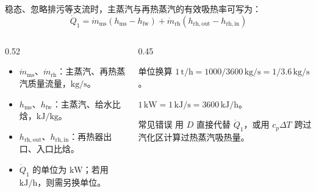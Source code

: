 \begin{frame}[t,shrink]{}
稳态、忽略排污等支流时，主蒸汽与再热蒸汽的有效吸热率可写为：
$$
\dot Q_1
=\dot m_{\mathrm{ms}}\left(h_{\mathrm{ms}}-h_{\mathrm{fw}}\right)
+\dot m_{\mathrm{rh}}\left(h_{\mathrm{rh,out}}-h_{\mathrm{rh,in}}\right)
$$
\begin{columns}[T,onlytextwidth]
\begin{column}{0.52\textwidth}
  \begin{itemize}
    \item \(\dot m_{\mathrm{ms}}\)、\(\dot m_{\mathrm{rh}}\)：主蒸汽、再热蒸汽质量流量，\(\mathrm{kg/s}\)。
    \item \(h_{\mathrm{ms}}\)、\(h_{\mathrm{fw}}\)：主蒸汽、给水比焓，\(\mathrm{kJ/kg}\)。
    \item \(h_{\mathrm{rh,out}}\)、\(h_{\mathrm{rh,in}}\)：再热器出口、入口比焓。
    \item \(\dot Q_1\) 的单位为 \(\mathrm{kW}\)；若用 \(\mathrm{kJ/h}\)，则需另换单位。
  \end{itemize}
\end{column}
\begin{column}{0.45\textwidth}
  \begin{keybox}{单位换算}
  \small
  \(1\,\mathrm{t/h}=1000/3600\,\mathrm{kg/s}=1/3.6\,\mathrm{kg/s}\)。
  \par\vspace{1mm}
  \(1\,\mathrm{kW}=1\,\mathrm{kJ/s}=3600\,\mathrm{kJ/h}\)。
  \end{keybox}
  \vspace{0.7mm}
  \begin{amberbox}{常见错误}
  \small 用 \(D\) 直接代替 \(\dot Q_1\)，或用 \(c_p\Delta T\) 跨过汽化区计算过热蒸汽吸热量。
  \end{amberbox}
\end{column}
\end{columns}
\end{frame}

